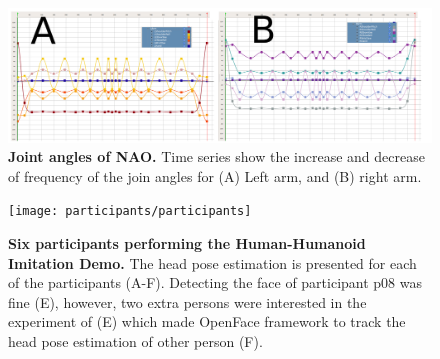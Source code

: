 \documentclass[12pt]{article}
\begin{document}
\begin{figure}[!ht]
\centering
\includegraphics[width=1.0\textwidth]{nao/lrarms}
    \caption{
	{\bf Joint angles of NAO.}
	Time series show the increase and decrease of frequency 
	of the join angles for (A) Left arm, and (B) right arm. 
        }
\label{fig:armangles}
\end{figure}



\begin{figure}[!ht]
\centering
\texttt{[image: participants/participants]}
    \caption{
	{\bf Six participants performing the Human-Humanoid Imitation Demo.}
	The head pose estimation is presented for each of the participants (A-F).
	Detecting the face of participant p08 was fine (E), however, two extra persons 
	were interested in the experiment of (E) which made OpenFace framework 
	to track the head pose estimation of other person (F).
        }
\label{fig:participants}
\end{figure}





\newpage



\end{document}
